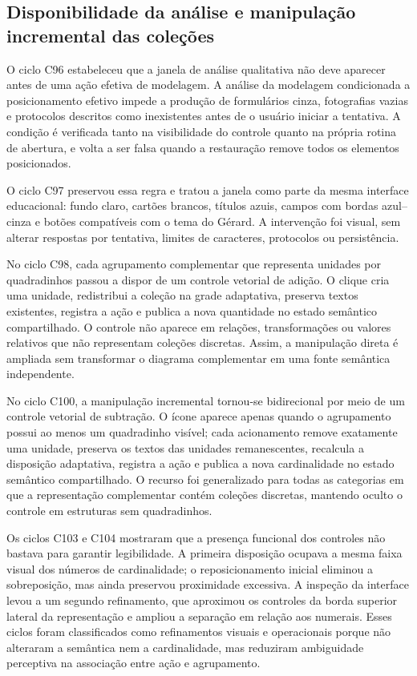 \documentclass[preprint,12pt,authoryear]{elsarticle}
\begin{document}
\subsection{Disponibilidade da análise e manipulação incremental das coleções}
O ciclo C96 estabeleceu que a janela de análise qualitativa não deve aparecer antes de uma ação efetiva de modelagem. A análise da modelagem condicionada a posicionamento efetivo impede a produção de formulários cinza, fotografias vazias e protocolos descritos como inexistentes antes de o usuário iniciar a tentativa. A condição é verificada tanto na visibilidade do controle quanto na própria rotina de abertura, e volta a ser falsa quando a restauração remove todos os elementos posicionados.

O ciclo C97 preservou essa regra e tratou a janela como parte da mesma interface educacional: fundo claro, cartões brancos, títulos azuis, campos com bordas azul--cinza e botões compatíveis com o tema do Gérard. A intervenção foi visual, sem alterar respostas por tentativa, limites de caracteres, protocolos ou persistência.

No ciclo C98, cada agrupamento complementar que representa unidades por quadradinhos passou a dispor de um controle vetorial de adição. O clique cria uma unidade, redistribui a coleção na grade adaptativa, preserva textos existentes, registra a ação e publica a nova quantidade no estado semântico compartilhado. O controle não aparece em relações, transformações ou valores relativos que não representam coleções discretas. Assim, a manipulação direta é ampliada sem transformar o diagrama complementar em uma fonte semântica independente.

No ciclo C100, a manipulação incremental tornou-se bidirecional por meio de um controle vetorial de subtração. O ícone aparece apenas quando o agrupamento possui ao menos um quadradinho visível; cada acionamento remove exatamente uma unidade, preserva os textos das unidades remanescentes, recalcula a disposição adaptativa, registra a ação e publica a nova cardinalidade no estado semântico compartilhado. O recurso foi generalizado para todas as categorias em que a representação complementar contém coleções discretas, mantendo oculto o controle em estruturas sem quadradinhos.

Os ciclos C103 e C104 mostraram que a presença funcional dos controles não bastava para garantir legibilidade. A primeira disposição ocupava a mesma faixa visual dos números de cardinalidade; o reposicionamento inicial eliminou a sobreposição, mas ainda preservou proximidade excessiva. A inspeção da interface levou a um segundo refinamento, que aproximou os controles da borda superior lateral da representação e ampliou a separação em relação aos numerais. Esses ciclos foram classificados como refinamentos visuais e operacionais porque não alteraram a semântica nem a cardinalidade, mas reduziram ambiguidade perceptiva na associação entre ação e agrupamento.
\end{document}
